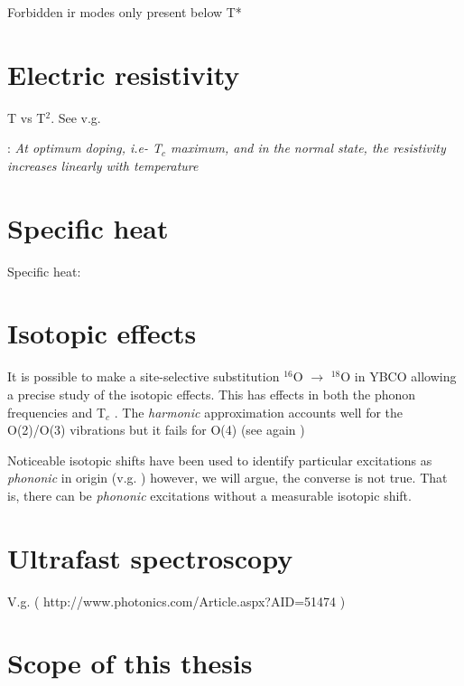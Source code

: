 Forbidden ir modes only present below T*

\section{Electric resistivity}
\label{sec:resistivity}

T vs T$^2$. See v.g. \cite{Timusk1999}

\cite{Muller2007a}: \textit{At optimum doping, i.e- T$_c$ maximum, and in the normal state, the resistivity increases linearly with temperature}

\section{Specific heat}
\label{sec:specific_heat}

Specific heat: \cite{Loram1993}


\section{Isotopic effects}
\label{sec:isotopic_effects}

It is possible to make a site-selective substitution $^{16}$O $\rightarrow$ $^{18}$O in YBCO \cite{Conder1993} allowing a precise study of the isotopic effects. 
This has effects in both the phonon frequencies \cite{Ruani1994} and T$_{c}$ \cite{Zech1994,Cardona1988}. 
The \textit{harmonic} approximation accounts well for the O(2)/O(3) vibrations but it fails for O(4) (see again \cite{Ruani1994})

Noticeable isotopic shifts have been used to identify particular excitations as \textit{phononic} in origin (v.g. \cite{Thomsen1990}) however, we will argue, the converse is not true. 
That is, there can be \textit{phononic} excitations without a measurable isotopic shift.

\section{Ultrafast spectroscopy}
\label{sec:ultrafast_spect}

V.g. \cite{Basov2005} \cite{Smallwood2012} ( http://www.photonics.com/Article.aspx?AID=51474 )

\section{Scope of this thesis}
\label{sec:scope}


